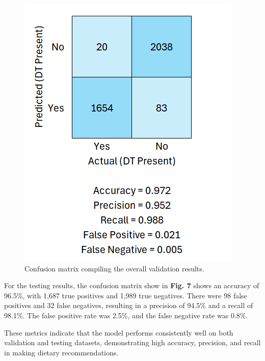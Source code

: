 \begin{figure}[H]
    \centering
    \includegraphics[width=\linewidth]{Figures/confusion_v.png}
    \caption{Confusion matrix compiling the overall validation results.}
\end{figure}

For the testing results, the confusion matrix show in \textbf{Fig. 7} shows an accuracy of 96.5\%, with 1,687 true positives and 1,989 true negatives. There were 98 false positives and 32 false negatives, resulting in a precision of 94.5\% and a recall of 98.1\%. The false positive rate was 2.5\%, and the false negative rate was 0.8\%.

These metrics indicate that the model performs consistently well on both validation and testing datasets, demonstrating high accuracy, precision, and recall in making dietary recommendations.


